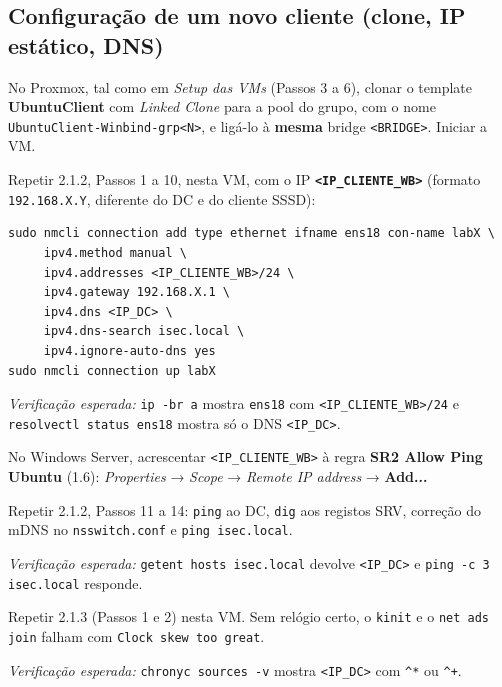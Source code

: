 
\subsection[Configuração de um novo cliente (clone, IP estático, DNS)]{Configuração de um novo cliente (clone, IP estático, DNS)}



No Proxmox, tal como em \emph{Setup das VMs} (Passos 3 a 6), clonar o template \textbf{UbuntuClient} com \emph{Linked Clone} para a pool do grupo, com o nome \texttt{UbuntuClient-Winbind-grp\textless{}N\textgreater{}}, e ligá-lo à \textbf{mesma} bridge \texttt{\textless{}BRIDGE\textgreater{}}. Iniciar a VM.


Repetir 2.1.2, Passos 1 a 10, nesta VM, com o IP \textbf{\texttt{\textless{}IP\_CLIENTE\_WB\textgreater{}}} (formato \texttt{192.168.X.Y}, diferente do DC e do cliente SSSD):

\begin{lstlisting}[style=bashstyle]
sudo nmcli connection add type ethernet ifname ens18 con-name labX \
     ipv4.method manual \
     ipv4.addresses <IP_CLIENTE_WB>/24 \
     ipv4.gateway 192.168.X.1 \
     ipv4.dns <IP_DC> \
     ipv4.dns-search isec.local \
     ipv4.ignore-auto-dns yes
sudo nmcli connection up labX
\end{lstlisting}

\emph{Verificação esperada:} \texttt{ip -br a} mostra \texttt{ens18} com \texttt{\textless{}IP\_CLIENTE\_WB\textgreater{}/\allowbreak{}24} e \texttt{resolvectl status ens18} mostra só o DNS \texttt{\textless{}IP\_DC\textgreater{}}.

No Windows Server, acrescentar \texttt{\textless{}IP\_CLIENTE\_WB\textgreater{}} à regra \textbf{SR2 Allow Ping Ubuntu} (1.6): \emph{Properties} → \emph{Scope} → \emph{Remote IP address} → \textbf{Add...}


Repetir 2.1.2, Passos 11 a 14: \texttt{ping} ao DC, \texttt{dig} aos registos SRV, correção do mDNS no \texttt{nsswitch.conf} e \texttt{ping isec.local}.

\emph{Verificação esperada:} \texttt{getent hosts isec.local} devolve \texttt{\textless{}IP\_DC\textgreater{}} e \texttt{ping -c 3 isec.local} responde.

\passo{Passo 4 - Sincronizar o relógio}

Repetir 2.1.3 (Passos 1 e 2) nesta VM. Sem relógio certo, o \texttt{kinit} e o \texttt{net ads join} falham com \texttt{Clock skew too great}.

\emph{Verificação esperada:} \texttt{chronyc sources -v} mostra \texttt{\textless{}IP\_DC\textgreater{}} com \texttt{\textasciicircum{}*} ou \texttt{\textasciicircum{}+}.

